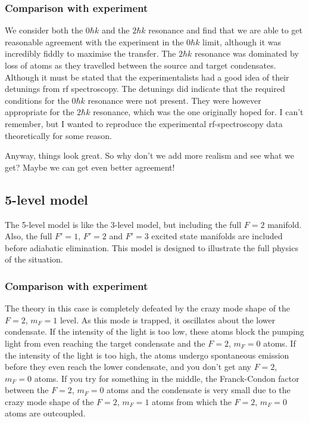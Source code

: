\subsubsection{Comparison with experiment}

We consider both the $0\hbar k$ and the $2\hbar k$ resonance and find that we are able to get reasonable agreement with the experiment in the $0\hbar k$ limit, although it was incredibly fiddly to maximise the transfer.  The $2\hbar k$ resonance was dominated by loss of atoms as they travelled between the source and target condensates.  Although it must be stated that the experimentalists had a good idea of their detunings from rf spectroscopy.  The detunings did indicate that the required conditions for the $0 \hbar k$ resonance were not present.  They were however appropriate for the $2 \hbar k$ resonance, which was the one originally hoped for.  I can't remember, but I wanted to reproduce the experimental rf-spectroscopy data theoretically for some reason.

Anyway, things look great. So why don't we add more realism and see what we get? Maybe we can get even better agreement!

\subsection{5-level model}

The 5-level model is like the 3-level model, but including the full $F=2$ manifold.  Also, the full $F'=1$, $F'=2$ and $F'=3$ excited state manifolds are included before adiabatic elimination.  This model is designed to illustrate the full physics of the situation.  

\subsubsection{Comparison with experiment}

The theory in this case is completely defeated by the crazy mode shape of the $F=2$, $m_F=1$ level.  As this mode is trapped, it oscillates about the lower condensate.  If the intensity of the light is too low, these atoms block the pumping light from even reaching the target condensate and the $F=2$, $m_F=0$ atoms.  If the intensity of the light is too high, the atoms undergo spontaneous emission before they even reach the lower condensate, and you don't get any $F=2$, $m_F=0$ atoms.  If you try for something in the middle, the Franck-Condon factor between the $F=2$, $m_F=0$ atoms and the condensate is very small due to the crazy mode shape of the $F=2$, $m_F=1$ atoms from which the $F=2$, $m_F=0$ atoms are outcoupled.

